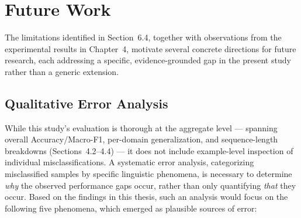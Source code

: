 \documentclass[12pt]{report} %
\begin{document}
\section{Future Work}
\label{sec:future-work}

The limitations identified in Section~6.4, together with observations from the experimental results in Chapter~4, motivate several concrete directions for future research, each addressing a specific, evidence-grounded gap in the present study rather than a generic extension.

\subsection{Qualitative Error Analysis}

While this study's evaluation is thorough at the aggregate level --- spanning overall Accuracy/Macro-F1, per-domain generalization, and sequence-length breakdowns (Sections~4.2--4.4) --- it does not include example-level inspection of individual misclassifications. A systematic error analysis, categorizing misclassified samples by specific linguistic phenomena, is necessary to determine \textit{why} the observed performance gaps occur, rather than only quantifying \textit{that} they occur. Based on the findings in this thesis, such an analysis would focus on the following five phenomena, which emerged as plausible sources of error:
\end{document}
